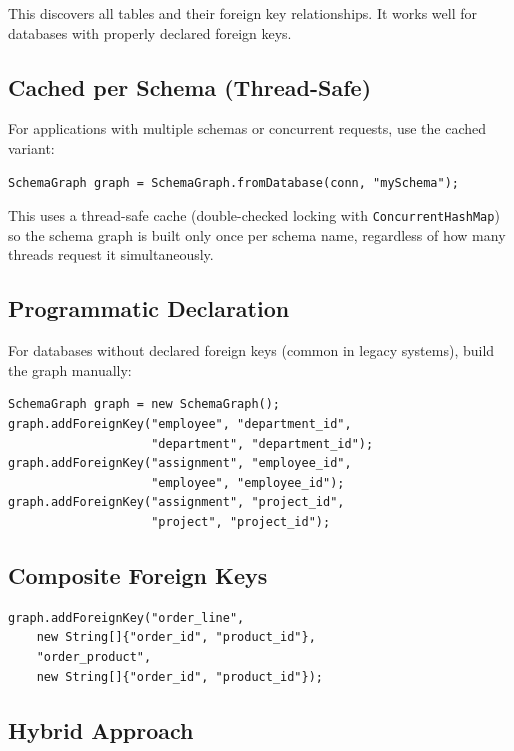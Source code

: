 \noindent
This discovers all tables and their foreign key relationships.  It works well for databases with properly declared foreign keys.

\subsection{Cached per Schema (Thread-Safe)}

For applications with multiple schemas or concurrent requests, use the cached variant:

\begin{lstlisting}[style=java]
SchemaGraph graph = SchemaGraph.fromDatabase(conn, "mySchema");
\end{lstlisting}

\noindent
This uses a thread-safe cache (double-checked locking with \texttt{ConcurrentHashMap}) so the schema graph is built only once per schema name, regardless of how many threads request it simultaneously.

\subsection{Programmatic Declaration}

For databases without declared foreign keys (common in legacy systems), build the graph manually:

\begin{lstlisting}[style=java]
SchemaGraph graph = new SchemaGraph();
graph.addForeignKey("employee", "department_id",
                    "department", "department_id");
graph.addForeignKey("assignment", "employee_id",
                    "employee", "employee_id");
graph.addForeignKey("assignment", "project_id",
                    "project", "project_id");
\end{lstlisting}

\subsection{Composite Foreign Keys}

\begin{lstlisting}[style=java]
graph.addForeignKey("order_line",
    new String[]{"order_id", "product_id"},
    "order_product",
    new String[]{"order_id", "product_id"});
\end{lstlisting}

\subsection{Hybrid Approach}

